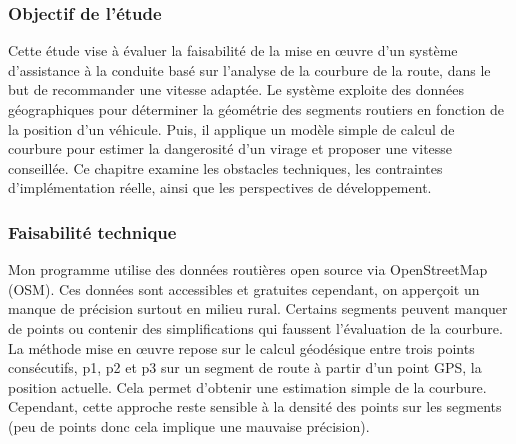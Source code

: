 

\subsubsection{Objectif de l'étude}
Cette étude vise à évaluer la faisabilité de la mise en œuvre d’un système d’assistance à la conduite basé sur l’analyse de la courbure de la route, dans le but de recommander une vitesse adaptée. Le système exploite des données géographiques pour déterminer la géométrie des segments routiers en fonction de la position d’un véhicule. Puis, il applique un modèle simple de calcul de courbure pour estimer la dangerosité d’un virage et proposer une vitesse conseillée. Ce chapitre examine les obstacles techniques, les contraintes d’implémentation réelle, ainsi que les perspectives de développement.

\subsubsection{Faisabilité technique}
Mon programme utilise des données routières open source via OpenStreetMap (OSM). Ces données sont accessibles et gratuites cependant, on apperçoit un manque de précision surtout en milieu rural. Certains segments peuvent manquer de points ou contenir des simplifications qui faussent l’évaluation de la courbure.
La méthode mise en œuvre repose sur le calcul géodésique entre trois points consécutifs, p1, p2 et p3 sur un segment de route à partir d'un point GPS, la position actuelle. Cela permet d’obtenir une estimation simple de la courbure.
Cependant, cette approche reste sensible à la densité des points sur les segments (peu de points donc cela implique une mauvaise précision).

